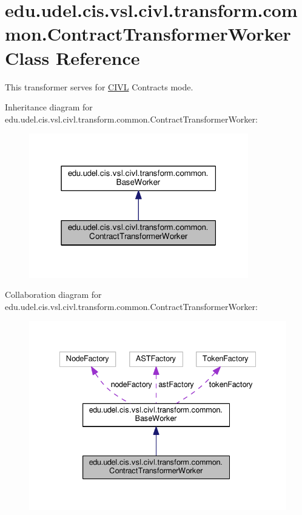 \hypertarget{classedu_1_1udel_1_1cis_1_1vsl_1_1civl_1_1transform_1_1common_1_1ContractTransformerWorker}{}\section{edu.\+udel.\+cis.\+vsl.\+civl.\+transform.\+common.\+Contract\+Transformer\+Worker Class Reference}
\label{classedu_1_1udel_1_1cis_1_1vsl_1_1civl_1_1transform_1_1common_1_1ContractTransformerWorker}


This transformer serves for \hyperlink{classedu_1_1udel_1_1cis_1_1vsl_1_1civl_1_1CIVL}{C\+I\+V\+L} Contracts mode.  




Inheritance diagram for edu.\+udel.\+cis.\+vsl.\+civl.\+transform.\+common.\+Contract\+Transformer\+Worker\+:
\nopagebreak
\begin{figure}[H]
\begin{center}
\leavevmode
\includegraphics[width=271pt]{classedu_1_1udel_1_1cis_1_1vsl_1_1civl_1_1transform_1_1common_1_1ContractTransformerWorker__inherit__graph}
\end{center}
\end{figure}


Collaboration diagram for edu.\+udel.\+cis.\+vsl.\+civl.\+transform.\+common.\+Contract\+Transformer\+Worker\+:
\nopagebreak
\begin{figure}[H]
\begin{center}
\leavevmode
\includegraphics[width=335pt]{classedu_1_1udel_1_1cis_1_1vsl_1_1civl_1_1transform_1_1common_1_1ContractTransformerWorker__coll__graph}
\end{center}
\end{figure}
